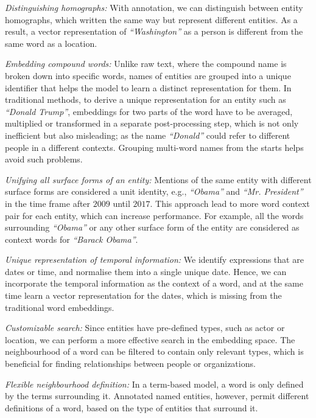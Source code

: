 \begin{compactitem}
\item \emph{Distinguishing homographs:} With annotation, we can distinguish between entity homographs, which written the same way but represent different entities. As a result, a vector representation of \emph{``Washington''} as a person is different from the same word as a location. \\
\item \emph{Embedding compound words:}  Unlike raw text, where the compound name is broken down into specific words, names of entities are grouped into a unique identifier that helps the model to learn a distinct representation for them. In traditional methods, to derive a unique representation for an entity such as \emph{``Donald Trump''}, embeddings for two parts of the word have to be averaged, multiplied or transformed in a separate post-processing step, which is not only inefficient but also misleading; as the name \emph{``Donald''} could refer to different people in a different contexts. Grouping multi-word names from the starts helps avoid such problems.\\ 
\item \emph{Unifying all surface forms of an entity:} Mentions of the same entity with different surface forms are considered a unit identity, e.g., \emph{``Obama''} and \emph{``Mr. President''} in the time frame after $2009$ until $2017$. This approach lead to more  word context pair for each entity, which can increase performance. For example, all the words surrounding \emph{``Obama''} or any other surface form of the entity are considered as context words for \emph{``Barack Obama''}. \\
\item \emph{Unique representation of temporal information:} We identify expressions that are dates or time, and normalise them into a single unique date. Hence, we can incorporate the temporal information as the context of a word, and at the same time learn a vector representation for the dates, which is missing from the traditional word embeddings. \\
\item \emph{Customizable search:} Since entities have pre-defined types, such as actor or location, we can perform a more effective search in the embedding space. The neighbourhood of a word can be filtered to contain only relevant types, which is beneficial for finding relationships between people or organizations. \\
\item \emph{Flexible neighbourhood definition:} In a term-based model, a word is only defined by the terms surrounding it.  Annotated named entities, however, permit different definitions of a word, based on the type of entities that surround it.

\end{compactitem}

